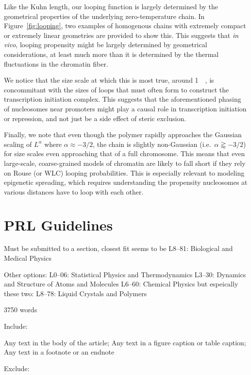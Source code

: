 \documentclass[%
 reprint,
superscriptaddress,
showpacs,preprintnumbers,
 amsmath,amssymb,
 aps,
 prl,
]{revtex4-1}
\begin{document}
Like the Kuhn length, our looping function is largely determined by the
    geometrical properties of the underlying zero-temperature chain.
In Figure~\ref{fig:looping}, two examples of homogenous chains with extremely
    compact or extremely linear geometries are provided to show this.
This suggests that \textit{in vivo}, looping propensity might be largely
    determined by geometrical considerations, at least much more than it is
    determined by the thermal fluctuations in the chromatin fiber.

We notice that the size scale at which this is most true, around
    \SI{1}{\kilo\basepair}, is concommitant with the sizes of loops that must
    often form to construct the transcription initiation complex.
This suggests that the aforementioned phasing of nucleosomes near promoters
    might play a causal role in transcription initiation or repression, and not
    just be a side effect of steric exclusion.

Finally, we note that even though the polymer rapidly approaches the Gaussian
    scaling of $L^\alpha$ where $\alpha \approx -3/2$, the chain is slightly
    non-Gaussian (i.e.\ $\alpha \gtrapprox -3/2$) for size scales even
    approaching that of a full chromosome.
This means that even large-scale, coarse-grained models of chromatin are likely
    to fall short if they rely on Rouse (or WLC) looping probabilities.
This is especially relevant to modeling epigenetic spreading, which requires
    understanding the propensity nucleosomes at various distances have to loop with
    each other.

\section{PRL Guidelines}

Must be submitted to a section, closest fit seems to be
L8--81: Biological and Medical Physics

Other options:
L0--06: Statistical Physics and Thermodynamics
L3--30: Dynamics and Structure of Atoms and Molecules
L6--60: Chemical Physics
but espeically these two:
L8--78: Liquid Crystals and Polymers


3750 words

Include:

Any text in the body of the article;
Any text in a figure caption or table caption;
Any text in a footnote or an endnote

Exclude:
\end{document}
